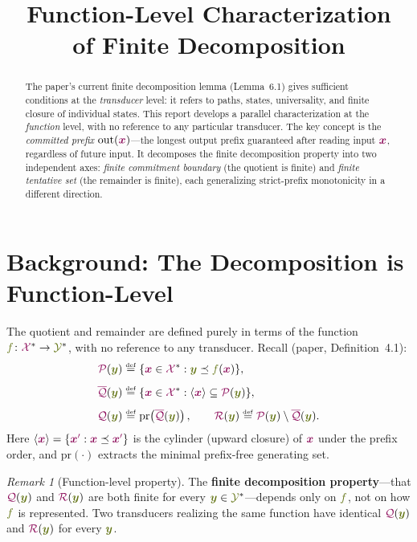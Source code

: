 \documentclass{article}
\title{Function-Level Characterization\\of Finite Decomposition}
\author{}
\date{}
\newcommand{\defn}[1]{\textbf{#1}}
\newcommand{\defeq}{\mathrel{\overset{\raisebox{-0.25ex}{\textnormal{\tiny def}}}{=}}}
\newcommand{\preCover}{{\color{TokenColor}\mathcal{P}}}
\newcommand{\maxQuotient}{{\color{TokenColor}\overline{\mathcal{Q}}}}
\newcommand{\Quotient}{{\color{TokenColor}\mathcal{Q}}}
\newcommand{\Remainder}{{\color{TokenColor}\mathcal{R}}}
\newcommand{\basisSet}[1]{\langle #1\rangle}
\newcommand{\transFnSym}[0]{f}
\newcommand{\transFn}{\ensuremath{{\color{CharacterColor}\transFnSym}}\xspace}
\newcommand{\srcStr}{\ensuremath{{\color{TokenColor}\boldsymbol{x}}}\xspace}
\newcommand{\srcStrp}{\ensuremath{{\color{TokenColor}\boldsymbol{x}^\prime}}\xspace}
\newcommand{\tgtStr}{{\color{CharacterColor}\boldsymbol{y}}}
\newcommand{\srcAlphabet}[0]{{\color{TokenColor}\ensuremath{\mathcal{X}}}\xspace}
\newcommand{\tgtAlphabet}[0]{{\color{CharacterColor}\ensuremath{\mathcal{Y}}}\xspace}
\newcommand{\srcStrings}[0]{\ensuremath{\srcAlphabet^*}\xspace}
\newcommand{\tgtStrings}[0]{\ensuremath{\tgtAlphabet^*}\xspace}
\newcommand{\committed}{\mathrm{out}}
\theoremstyle{plain}
\theoremstyle{definition}
\theoremstyle{remark}
\newtheorem{remark}[theorem]{Remark}
\begin{document}
\maketitle

\begin{abstract}
The paper's current finite decomposition lemma (Lemma~6.1) gives sufficient
conditions at the \emph{transducer} level: it refers to paths, states,
universality, and finite closure of individual states.  This report develops a
parallel characterization at the \emph{function} level, with no reference to
any particular transducer.  The key concept is the \emph{committed prefix}
$\committed(\srcStr)$---the longest output prefix guaranteed after reading
input $\srcStr$, regardless of future input.  It decomposes the finite
decomposition property into two independent axes: \emph{finite commitment
boundary} (the quotient is finite) and \emph{finite tentative set} (the
remainder is finite), each generalizing strict-prefix monotonicity in a
different direction.
\end{abstract}


\section{Background: The Decomposition is Function-Level}
\label{sec:background}

The quotient and remainder are defined purely in terms of the function
$\transFn \colon \srcStrings \to \tgtStrings$, with no reference to any
transducer.  Recall (paper, Definition~4.1):
%
\begin{align}
  \preCover(\tgtStr) &\defeq \{ \srcStr \in \srcStrings : \tgtStr \preceq \transFn(\srcStr) \}, \\[4pt]
  \maxQuotient(\tgtStr) &\defeq \{ \srcStr \in \srcStrings : \basisSet{\srcStr} \subseteq \preCover(\tgtStr) \},
    \label{eq:maxQ} \\[4pt]
  \Quotient(\tgtStr) &\defeq \mathrm{pr}\!\left(\maxQuotient(\tgtStr)\right),
    \qquad
  \Remainder(\tgtStr) \defeq \preCover(\tgtStr) \setminus \maxQuotient(\tgtStr).
    \label{eq:QR}
\end{align}
%
Here $\basisSet{\srcStr} = \{\srcStrp : \srcStr \preceq \srcStrp\}$ is the
cylinder (upward closure) of $\srcStr$ under the prefix order, and
$\mathrm{pr}(\cdot)$ extracts the minimal prefix-free generating set.

\begin{remark}[Function-level property]
\label{rem:function-level}
The \defn{finite decomposition property}---that $\Quotient(\tgtStr)$ and
$\Remainder(\tgtStr)$ are both finite for every $\tgtStr \in
\tgtStrings$---depends only on $\transFn$, not on how $\transFn$ is
represented.  Two transducers realizing the same function have identical
$\Quotient(\tgtStr)$ and $\Remainder(\tgtStr)$ for every $\tgtStr$.
\end{remark}
\end{document}
